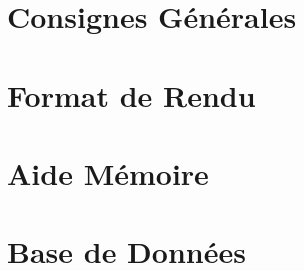 \documentclass[12pt,a4paper]{article}
\begin{document}
\maketitle





\newpage

\tableofcontents

\newpage

\section{Consignes Générales}

\bigskip



\newpage

\section{Format de Rendu}
\label{sec:FormatDeRendu}

\vspace*{1cm}



\newpage

\section{Aide Mémoire}
\label{sec:AideMemoire}

\vspace*{1cm}




\newpage


\section{Base de Données}

\vspace*{0.7cm}






%
\end{document}

